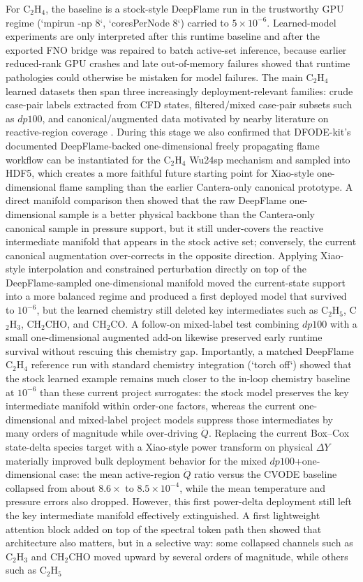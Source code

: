 \documentclass[11pt]{article}
\begin{document}
For C$_2$H$_4$, the baseline is a stock-style DeepFlame run in the trustworthy GPU regime (`mpirun -np 8`, `coresPerNode 8`) carried to $5\times10^{-6}$. Learned-model experiments are only interpreted after this runtime baseline and after the exported FNO bridge was repaired to batch active-set inference, because earlier reduced-rank GPU crashes and late out-of-memory failures showed that runtime pathologies could otherwise be mistaken for model failures. The main C$_2$H$_4$ learned datasets then span three increasingly deployment-relevant families: crude case-pair labels extracted from CFD states, filtered/mixed case-pair subsets such as $dp100$, and canonical/augmented data motivated by nearby literature on reactive-region coverage \cite{li2025comprehensive,xiao2026physicsaware,li2026dfodekit}. During this stage we also confirmed that DFODE-kit’s documented DeepFlame-backed one-dimensional freely propagating flame workflow can be instantiated for the C$_2$H$_4$ Wu24sp mechanism and sampled into HDF5, which creates a more faithful future starting point for Xiao-style one-dimensional flame sampling than the earlier Cantera-only canonical prototype. A direct manifold comparison then showed that the raw DeepFlame one-dimensional sample is a better physical backbone than the Cantera-only canonical sample in pressure support, but it still under-covers the reactive intermediate manifold that appears in the stock active set; conversely, the current canonical augmentation over-corrects in the opposite direction. Applying Xiao-style interpolation and constrained perturbation directly on top of the DeepFlame-sampled one-dimensional manifold moved the current-state support into a more balanced regime and produced a first deployed model that survived to $10^{-6}$, but the learned chemistry still deleted key intermediates such as C$_2$H$_5$, C$_2$H$_3$, CH$_2$CHO, and CH$_2$CO. A follow-on mixed-label test combining $dp100$ with a small one-dimensional augmented add-on likewise preserved early runtime survival without rescuing this chemistry gap. Importantly, a matched DeepFlame C$_2$H$_4$ reference run with standard chemistry integration (`torch off`) showed that the stock learned example remains much closer to the in-loop chemistry baseline at $10^{-6}$ than these current project surrogates: the stock model preserves the key intermediate manifold within order-one factors, whereas the current one-dimensional and mixed-label project models suppress those intermediates by many orders of magnitude while over-driving $\dot{Q}$. Replacing the current Box--Cox state-delta species target with a Xiao-style power transform on physical $\Delta Y$ materially improved bulk deployment behavior for the mixed $dp100$+one-dimensional case: the mean active-region $\dot{Q}$ ratio versus the CVODE baseline collapsed from about $8.6\times$ to $8.5\times10^{-4}$, while the mean temperature and pressure errors also dropped. However, this first power-delta deployment still left the key intermediate manifold effectively extinguished. A first lightweight attention block added on top of the spectral token path then showed that architecture also matters, but in a selective way: some collapsed channels such as C$_2$H$_3$ and CH$_2$CHO moved upward by several orders of magnitude, while others such as C$_2$H$_5$ 
\end{document}
